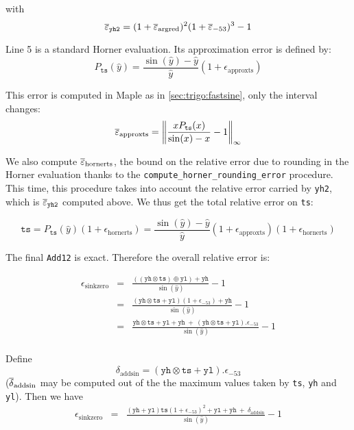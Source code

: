 with
\begin{equation}
  {\overline{\varepsilon}}_{\mathtt{yh2}} = (1+{\overline{\varepsilon}}_{\mathrm{argred}})^2(1+{\overline{\varepsilon}}_{-53})^3 - 1
\end{equation}

Line 5 is a standard Horner evaluation. Its approximation error is defined by: 
$$
P_{\mathtt{ts}}(\hat{y}) = \frac{\sin(\hat{y})-\hat{y}}{\hat{y}}(1+\epsilon_{\mathrm{approxts}})
$$

This error is computed in Maple as in \ref{sec:trigo:fastsine}, only the interval changes:
$${\overline{\varepsilon}}_{\mathrm{approxts}} = \left\Vert \frac{xP_{\mathtt{ts}}(x)}{\sin(x)-x} -1 \right\Vert_{\infty}$$

We also compute ${\overline{\varepsilon}}_{\mathrm{hornerts}}$, the bound on the relative error due
to rounding in the Horner evaluation thanks to the
\texttt{compute\_horner\_rounding\_error} procedure. This time, this procedure 
takes into account the relative error carried by \texttt{yh2}, which is
${\overline{\varepsilon}}_{\mathtt{yh2}}$ computed above.
We thus get the total relative error on \texttt{ts}:

\begin{equation}
  \mathtt{ts} = P_{\mathtt{ts}}(\hat{y})(1+\epsilon_{\mathrm{hornerts}}) = \frac{\sin(\hat{y})-\hat{y}}{\hat{y}}(1+\epsilon_{\mathrm{approxts}})(1+\epsilon_{\mathrm{hornerts}})
  \label{eq:sink0ts}
\end{equation}

The final \texttt{Add12} is exact. Therefore the overall relative error is:

\begin{eqnarray*}
  \epsilon_{\mathrm{sinkzero}} 
  &=& \frac{((\mathtt{yh}\otimes \mathtt{ts}) \oplus \mathtt{yl}) + \mathtt{yh}}{\sin(\hat{y})} -1 \\
  &=& \frac{(\mathtt{yh}\otimes\mathtt{ts} + \mathtt{yl})(1+\epsilon_{-53}) + \mathtt{yh}}{\sin(\hat{y})} -1\\
  &=& \frac{\mathtt{yh}\otimes\mathtt{ts} + \mathtt{yl} + \mathtt{yh}    \ +\  (\mathtt{yh}\otimes\mathtt{ts} + \mathtt{yl}).\epsilon_{-53}}{\sin(\hat{y})} -1\\
\end{eqnarray*}

Define 
\begin{equation}
  \delta_{\mathrm{addsin}} = (\mathtt{yh}\otimes\mathtt{ts} + \mathtt{yl}).\epsilon_{-53}
\label{eq:addsin}
\end{equation}
(${\overline{\delta}}_{\mathrm{addsin}}$ may be computed out of the the maximum
values taken by \texttt{ts}, \texttt{yh} and \texttt{yl}). Then we have
\begin{eqnarray*}
  \epsilon_{\mathrm{sinkzero}} 
  &=& \frac{(\mathtt{yh} + \mathtt{yl})\mathtt{ts}(1+\epsilon_{-53})^2 + \mathtt{yl} + \mathtt{yh}    \ +\  \delta_{\mathrm{addsin}} }{\sin(\hat{y})} -1\\
\end{eqnarray*}

